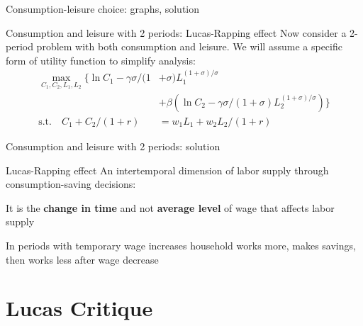 \documentclass{beamer}
\newenvironment{mytemize}
{\vfill\itemize[nolistsep,itemsep=\fill,label=\color{blue}{$\triangleright$}]}
  {\enditemize}
\begin{document}
\begin{frame}{Consumption-leisure choice: graphs, solution}
\end{frame}

\begin{frame}{Consumption and leisure with 2 periods: Lucas-Rapping effect}
  Now consider a 2-period problem with both consumption and leisure. We will assume a specific form of utility function to simplify analysis:
  \begin{align*}
	\max_{C_1, C_2, L_1, L_2}  \{\ln C_1 - \gamma \sigma/(1&+\sigma) L_1^{(1+\sigma)/\sigma}  \\
	&+ \beta(\ln C_2 - \gamma \sigma/(1+\sigma) L_2^{(1+\sigma)/\sigma})\} \\
	\text{s.t.} \quad C_1 + C_2/(1+r) &= w_1 L_1 + w_2 L_2 / (1+r)
  \end{align*}
  
\end{frame}
\begin{frame}{Consumption and leisure with 2 periods: solution}
\end{frame}

\begin{frame}{Lucas-Rapping effect}
  An intertemporal dimension of labor supply through consumption-saving decisions:
  \begin{mytemize}
  \item It is the \textbf{change in time} and not \textbf{average level} of wage that affects labor supply
  \item In periods with temporary wage increases household works more, makes savings, then works less after wage decrease
  \end{mytemize}
\end{frame}
\section{Lucas Critique}
\end{document}
